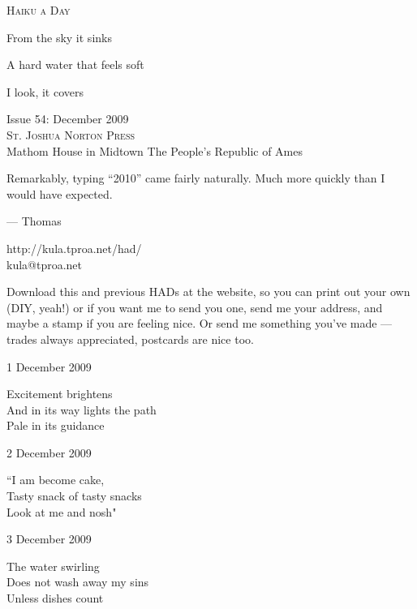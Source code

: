 \documentclass[12pt]{article}
\begin{document}
\begin{center}
{\fontsize{36}{48}\selectfont \textsc{Haiku a Day }}
\end{center}

\vspace*{3.5cm}

{\fontsize{26}{52}\selectfont 
From the sky it sinks
	 
A hard water that feels soft
	 
I look, it covers

}

\vspace*{5.0cm}
\begin{center}
{\large{Issue 54: December 2009}} \\[5mm]
{\fontsize{8}{8}\selectfont  \textsc{ St. Joshua Norton Press }} \\[1mm]
{\fontsize{6}{6}\selectfont Mathom House in Midtown \textbar The People's Republic of Ames }
\end{center}


\newpage

Remarkably, typing ``2010'' came fairly naturally. Much more quickly
than I would have expected.

--- Thomas

http://kula.tproa.net/had/ \\
kula@tproa.net

Download this and previous HADs at the website, so you can
print out your own (DIY, yeah!) or if you want me to send
you one, send me your address, and maybe a stamp if you
are feeling nice. Or send me something you've made ---
trades always appreciated, postcards are nice too.

\vspace*{2cm}

1 December 2009

Excitement brightens \\
And in its way lights the path \\
Pale in its guidance

2 December 2009

``I am become cake, \\
Tasty snack of tasty snacks \\
Look at me and nosh"

3 December 2009

The water swirling \\
Does not wash away my sins \\
Unless dishes count
\end{document}
